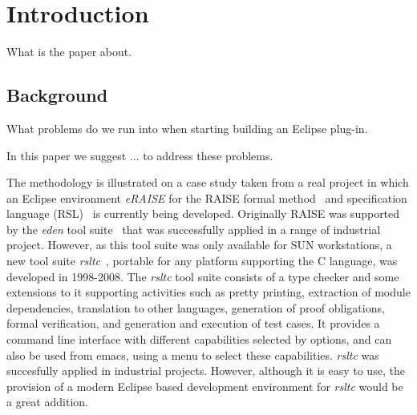 \documentclass[conference]{IEEEtran}
\begin{document}

%
\IEEEpeerreviewmaketitle


\section{Introduction}
\label{sec:introduction}

What is the paper about.

%
\subsection{Background}
\label{sec:background}

What problems do we run into when starting building an Eclipse plug-in.

In this paper we suggest  ... to address these problems.

The  methodology is illustrated on a case study taken from a real
project in which an Eclipse environment \emph{eRAISE} for the RAISE formal method~\cite{RMG95}
and 
specification language (RSL)~\cite{RLG92} is currently being developed. 
Originally RAISE was supported by the \emph{eden} tool suite~\cite{edenReferenceManual} that was successfully applied in a range of industrial project.
However, as this tool suite was only available for SUN workstations,  a new tool suite 
\emph{rsltc}~\cite{rsltcUserGuide,RAISETools2003}, portable for any platform supporting the C language, was developed in 1998-2008. The \emph{rsltc} tool suite consists of a type checker and some extensions to it  supporting activities such as  pretty printing, extraction of module dependencies, translation to other languages, generation of proof obligations, formal verification, and generation and execution of test cases. It provides a command line interface with different capabilities selected by options, and can also be used from emacs, using a menu to select these capabilities.  \emph{rsltc} was succesfully applied in industrial projects. However, although it is easy to use, the provision of a modern Eclipse based development environment for  \emph{rsltc} would be a great addition. 
 
\end{document}
